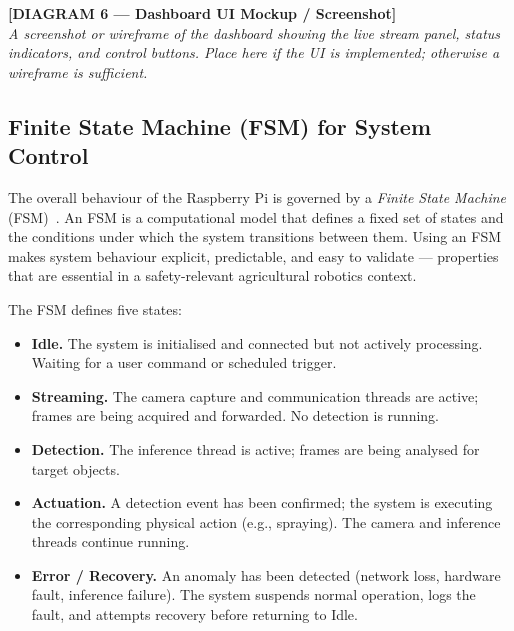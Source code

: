 \bigskip
\noindent\textbf{[DIAGRAM 6 — Dashboard UI Mockup / Screenshot]}\\
\textit{A screenshot or wireframe of the dashboard showing the live
stream panel, status indicators, and control buttons. Place here if
the UI is implemented; otherwise a wireframe is sufficient.}
\bigskip
 
\subsection{Finite State Machine (FSM) for System Control}
\label{sec:fsm}
 
The overall behaviour of the Raspberry Pi is governed by a
\emph{Finite State Machine} (FSM)~\cite{hopcroft2006automata}. An FSM
is a computational model that defines a fixed set of states and the
conditions under which the system transitions between them. Using an
FSM makes system behaviour explicit, predictable, and easy to
validate — properties that are essential in a safety-relevant
agricultural robotics context.
 
The FSM defines five states:
 
\begin{itemize}
    \item \textbf{Idle.} The system is initialised and connected but
          not actively processing. Waiting for a user command or
          scheduled trigger.
 
    \item \textbf{Streaming.} The camera capture and communication
          threads are active; frames are being acquired and forwarded.
          No detection is running.
 
    \item \textbf{Detection.} The inference thread is active;
          frames are being analysed for target objects.
 
    \item \textbf{Actuation.} A detection event has been confirmed;
          the system is executing the corresponding physical action
          (e.g., spraying). The camera and inference threads continue
          running.
 
    \item \textbf{Error / Recovery.} An anomaly has been detected
          (network loss, hardware fault, inference failure). The system
          suspends normal operation, logs the fault, and attempts
          recovery before returning to Idle.
\end{itemize}
 
